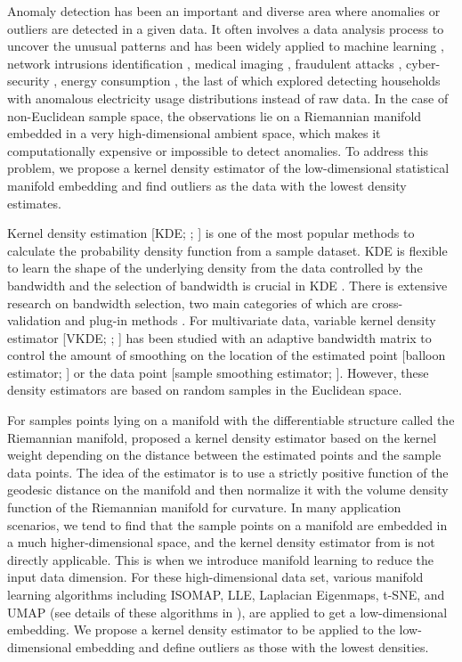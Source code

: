 \documentclass[11pt,a4paper,]{article}
\begin{document}
Anomaly detection has been an important and diverse area where anomalies
or outliers are detected in a given data. It often involves a data
analysis process to uncover the unusual patterns and has been widely
applied to machine learning \autocite{Omar2013-lz}, network intrusions
identification \autocite{Ahmed2016-co,Bhuyan2013-ra}, medical imaging
\autocite{Fernando2022-ef}, fraudulent attacks \autocite{Ahmed2016-dz}, cyber-security
\autocite{Ten2011-co}, energy consumption \autocite{Cheng2021-ex}, the last of which
explored detecting households with anomalous electricity usage
distributions instead of raw data. In the case of non-Euclidean sample
space, the observations lie on a Riemannian manifold embedded in a very
high-dimensional ambient space, which makes it computationally expensive
or impossible to detect anomalies. To address this problem, we propose a
kernel density estimator of the low-dimensional statistical manifold
embedding and find outliers as the data with the lowest density
estimates.

Kernel density estimation {[}KDE; \textcite{Parzen1962-gt}; \textcite{Chen2017-dw}{]} is one of
the most popular methods to calculate the probability density function
from a sample dataset. KDE is flexible to learn the shape of the
underlying density from the data controlled by the bandwidth and the
selection of bandwidth is crucial in KDE \autocite{Jones1990-oe,Terrell1992-ut}. There is extensive research on bandwidth selection,
two main categories of which are cross-validation \autocite{Jones1992-ta,Sain1994-gr} and plug-in methods \autocite{Wand1994-gc,Duong2003-sp}. For
multivariate data, variable kernel density estimator {[}VKDE;
\textcite{Jones1990-oe}; \textcite{Terrell1992-ut}{]} has been studied with an adaptive
bandwidth matrix to control the amount of smoothing on the location of
the estimated point {[}balloon estimator; \textcite{Terrell1992-ef}{]} or the data
point {[}sample smoothing estimator; \textcite{Terrell1992-ef}{]}. However, these
density estimators are based on random samples in the Euclidean space.

For samples points lying on a manifold with the differentiable structure
called the Riemannian manifold, \textcite{Pelletier2005-vu} proposed a kernel
density estimator based on the kernel weight depending on the distance
between the estimated points and the sample data points. The idea of the
estimator is to use a strictly positive function of the geodesic
distance on the manifold and then normalize it with the volume density
function of the Riemannian manifold for curvature. \autocite{Henry2009-ll} In
many application scenarios, we tend to find that the sample points on a
manifold are embedded in a much higher-dimensional space, and the kernel
density estimator from \textcite{Pelletier2005-vu} is not directly applicable.
This is when we introduce manifold learning to reduce the input data
dimension. For these high-dimensional data set, various manifold
learning algorithms including ISOMAP, LLE, Laplacian Eigenmaps, t-SNE,
and UMAP (see details of these algorithms in \textcite{Cheng2021-ex}), are applied
to get a low-dimensional embedding. We propose a kernel density
estimator to be applied to the low-dimensional embedding and define
outliers as those with the lowest densities.
\end{document}
